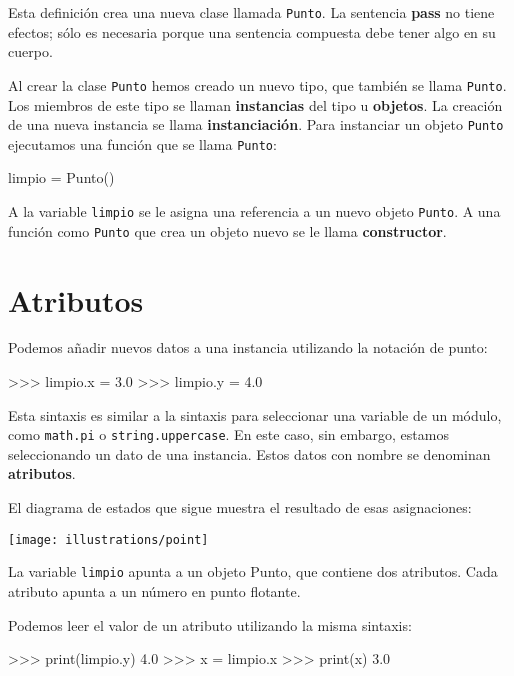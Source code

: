 Esta definición crea una nueva clase llamada \texttt{Punto}. La sentencia
\textbf{pass} no tiene efectos; sólo es necesaria porque una sentencia
compuesta debe tener algo en su cuerpo.

Al crear la clase \texttt{Punto} hemos creado un nuevo tipo, que también
se llama \texttt{Punto}. Los miembros de este tipo se llaman \textbf{instancias}
del tipo u \textbf{objetos}. La creación de una nueva instancia se
llama \textbf{instanciación}. Para instanciar un objeto \texttt{Punto}
ejecutamos una función que se llama \texttt{Punto}:

  
\begin{pythoncode}
limpio = Punto()
\end{pythoncode}

A la variable \texttt{limpio} se le asigna una referencia a un nuevo
objeto \texttt{Punto}. A una función como \texttt{Punto} que crea
un objeto nuevo se le llama \textbf{constructor}.

\section{Atributos}


Podemos añadir nuevos datos a una instancia utilizando la notación
de punto:
\begin{pyconcode}
>>> limpio.x = 3.0
>>> limpio.y = 4.0
\end{pyconcode}

Esta sintaxis es similar a la sintaxis para seleccionar una variable
de un módulo, como \texttt{math.pi} o \texttt{string.uppercase}. En
este caso, sin embargo, estamos seleccionando un dato de una instancia.
Estos datos con nombre se denominan \textbf{atributos}.

El diagrama de estados que sigue muestra el resultado de esas asignaciones:

\beforefig \centerline{\texttt{[image: illustrations/point]}}
\afterfig

La variable \texttt{limpio} apunta a un objeto Punto, que contiene
dos atributos. Cada atributo apunta a un número en punto flotante.

Podemos leer el valor de un atributo utilizando la misma sintaxis:

\begin{pyconcode}
>>> print(limpio.y)
4.0
>>> x = limpio.x
>>> print(x)
3.0
\end{pyconcode}

